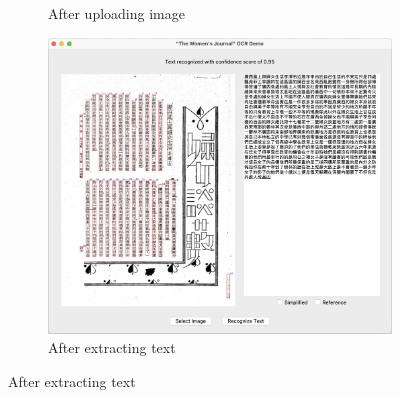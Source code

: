 \documentclass[12pt,twoside]{report}
\begin{document}
\begin{figure}[htbp]
\begin{subfigure}[b]{0.3\linewidth}
        \caption{After uploading image}
        \label{fig:ui1.2}
    \end{subfigure}
    \hfill
    \begin{subfigure}[b]{0.3\linewidth}
        \includegraphics[width=\linewidth]{./figures/ui1.3.jpeg}
        \caption{After extracting text}
        \label{fig:ui1.3}
    \end{subfigure}


\end{figure}
\end{document}
